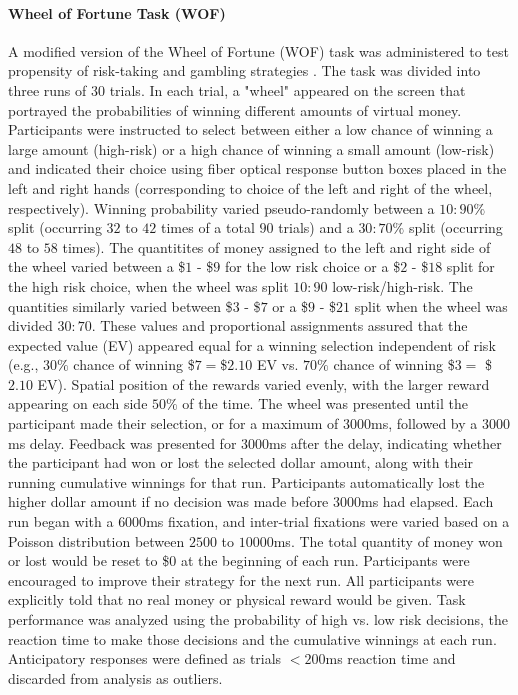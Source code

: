 \documentclass[utf8]{frontiersSCNS} %
\begin{document}
\paragraph{Wheel of Fortune Task (WOF)} A modified version of the Wheel of Fortune (WOF) task was administered to test propensity of risk-taking and gambling strategies \citep{ernst2004wheeloffortune}. The task was divided into three runs of 30 trials. In each trial, a "wheel" appeared on the screen that portrayed the probabilities of winning different amounts of virtual money. Participants were instructed to select between either a low chance of winning a large amount (high-risk) or a high chance of winning a small amount (low-risk) and indicated their choice using fiber optical response button boxes placed in the left and right hands (corresponding to choice of the left and right of the wheel, respectively). Winning probability varied pseudo-randomly between a $10:90\%$ split (occurring $32$ to $42$ times of a total $90$ trials) and a $30:70\%$ split (occurring $48$ to $58$ times). The quantitites of money assigned to the left and right side of the wheel varied between a \$$1$ - \$$9$ for the low risk choice or a \$$2$ - \$$18$ split for the high risk choice, when the wheel was split $10:90$ low-risk/high-risk. The quantities similarly varied between \$$3$ - \$$7$ or a \$$9$ - \$$21$ split when the wheel was divided $30:70$.  These values and proportional assignments assured that the expected value (EV) appeared equal for a winning selection independent of risk (e.g., $30\%$ chance of winning \$$7 = $\$$2.10$ EV vs. $70\%$ chance of winning \$$3 =$ \$$2.10$ EV).  Spatial position of the rewards varied evenly, with the larger reward appearing on each side $50\%$ of the time.  The wheel was presented until the participant made their selection, or for a maximum of $3000$ms, followed by a $3000$ms delay. Feedback was presented for $3000$ms after the delay, indicating whether the participant had won or lost the selected dollar amount, along with their running cumulative winnings for that run.  Participants automatically lost the higher dollar amount if no decision was made before $3000$ms had elapsed.  Each run began with a $6000$ms fixation, and inter-trial fixations were varied based on a Poisson distribution between $2500$ to $10000$ms. The total quantity of money won or lost would be reset to \$$0$ at the beginning of each run. Participants were encouraged to improve their strategy for the next run.  All participants were explicitly told that no real money or physical reward would be given. Task performance was analyzed using the probability of high vs. low risk decisions, the reaction time to make those decisions and the cumulative winnings at each run. Anticipatory responses were defined as trials $<200$ms reaction time and discarded from analysis as outliers.
\end{document}
